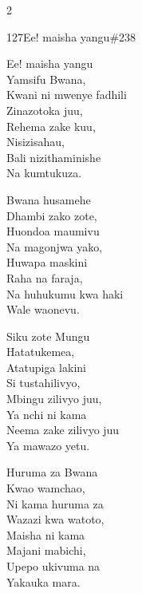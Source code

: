 \documentclass{article}
\begin{document}
\begin{multicols}{2}
\begin{hymn}{127}{Ee! maisha yangu}{\#238}
\begin{stanza}
Ee! maisha yangu\\
Yamsifu Bwana,\\
Kwani ni mwenye fadhili\\
Zinazotoka juu,\\
Rehema zake kuu,\\
Nisizisahau,\\
Bali nizithaminishe\\
Na kumtukuza.
\end{stanza}
\begin{stanza}
Bwana husamehe\\
Dhambi zako zote,\\
Huondoa maumivu\\
Na magonjwa yako,\\
Huwapa maskini\\
Raha na faraja,\\
Na huhukumu kwa haki\\
Wale waonevu.
\end{stanza}
\begin{stanza}
Siku zote Mungu\\
Hatatukemea,\\
Atatupiga lakini\\
Si tustahilivyo,\\
Mbingu zilivyo juu,\\
Ya nchi ni kama\\
Neema zake zilivyo juu\\
Ya mawazo yetu.
\end{stanza}
\begin{stanza}
Huruma za Bwana\\
Kwao wamchao,\\
Ni kama huruma za\\
Wazazi kwa watoto,\\
Maisha ni kama\\
Majani mabichi,\\
Upepo ukivuma na\\
Yakauka mara.
\end{stanza}
\end{hymn}


\end{multicols}
\end{document}
